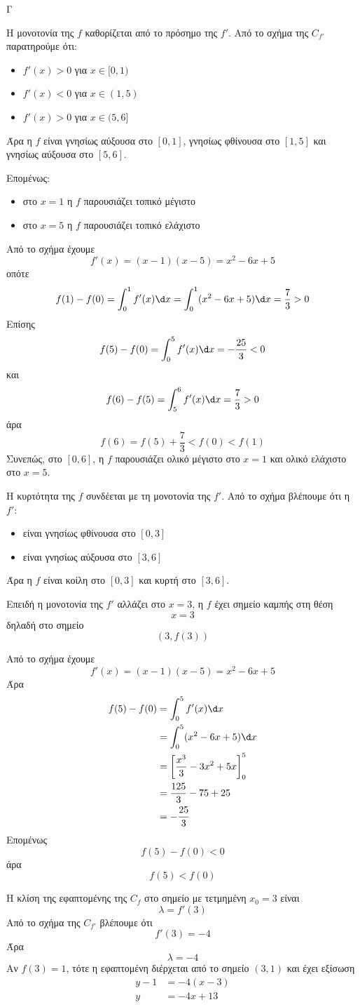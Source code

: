 \begin{thema}{Γ}
\begin{erwthma}
\item Η μονοτονία της $f$ καθορίζεται από το πρόσημο της $f'$.
Από το σχήμα της $C_{f'}$ παρατηρούμε ότι:
\begin{itemize}
\item $f'(x)>0$ για $x\in[0,1)$
\item $f'(x)<0$ για $x\in(1,5)$
\item $f'(x)>0$ για $x\in(5,6]$
\end{itemize}
Άρα η $f$ είναι γνησίως αύξουσα στο $[0,1]$, γνησίως φθίνουσα στο $[1,5]$ και γνησίως αύξουσα στο $[5,6]$.

Επομένως:
\begin{itemize}
\item στο $x=1$ η $f$ παρουσιάζει τοπικό μέγιστο
\item στο $x=5$ η $f$ παρουσιάζει τοπικό ελάχιστο
\end{itemize}

Από το σχήμα έχουμε
\[
f'(x)=(x-1)(x-5)=x^2-6x+5
\]
οπότε
\[
f(1)-f(0)=\dint_0^1 f'(x)\d x=\dint_0^1(x^2-6x+5)\d x=\frac{7}{3}>0
\]
Επίσης
\[
f(5)-f(0)=\dint_0^5 f'(x)\d x=-\frac{25}{3}<0
\]
και
\[
f(6)-f(5)=\dint_5^6 f'(x)\d x=\frac{7}{3}>0
\]
άρα
\[
f(6)=f(5)+\frac{7}{3}<f(0)<f(1)
\]
Συνεπώς, στο $[0,6]$, η $f$ παρουσιάζει ολικό μέγιστο στο $x=1$ και ολικό ελάχιστο στο $x=5$.

\item Η κυρτότητα της $f$ συνδέεται με τη μονοτονία της $f'$.
Από το σχήμα βλέπουμε ότι η $f'$:
\begin{itemize}
\item είναι γνησίως φθίνουσα στο $[0,3]$
\item είναι γνησίως αύξουσα στο $[3,6]$
\end{itemize}
Άρα η $f$ είναι κοίλη στο $[0,3]$ και κυρτή στο $[3,6]$.

Επειδή η μονοτονία της $f'$ αλλάζει στο $x=3$, η $f$ έχει σημείο καμπής στη θέση
\[
x=3
\]
δηλαδή στο σημείο
\[
(3,f(3))
\]

\item Από το σχήμα έχουμε
\[
f'(x)=(x-1)(x-5)=x^2-6x+5
\]
Άρα
\begin{align*}
f(5)-f(0)
&=\dint_0^5 f'(x)\d x\\
&=\dint_0^5(x^2-6x+5)\d x\\
&=\left[\frac{x^3}{3}-3x^2+5x\right]_0^5\\
&=\frac{125}{3}-75+25\\
&=-\frac{25}{3}
\end{align*}
Επομένως
\[
f(5)-f(0)<0
\]
άρα
\[
f(5)<f(0)
\]

\item Η κλίση της εφαπτομένης της $C_f$ στο σημείο με τετμημένη $x_0=3$ είναι
\[
\lambda=f'(3)
\]
Από το σχήμα της $C_{f'}$ βλέπουμε ότι
\[
f'(3)=-4
\]
Άρα
\[
\lambda=-4
\]
Αν $f(3)=1$, τότε η εφαπτομένη διέρχεται από το σημείο $(3,1)$ και έχει εξίσωση
\begin{align*}
y-1&=-4(x-3)\\
y&=-4x+13
\end{align*}
\end{erwthma}
\end{thema}
